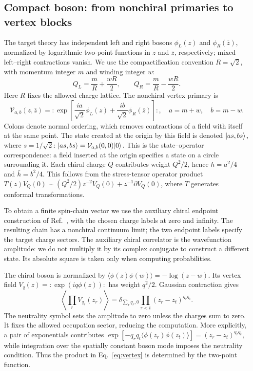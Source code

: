 \subsection{Compact boson: from nonchiral primaries to vertex blocks}
\label{sec:bosonconstruction}
The target theory has independent left and right bosons $\phi_L(z)$ and
$\phi_R(\bar z)$, normalized by logarithmic two-point functions in $z$
and $\bar z$, respectively; mixed left--right contractions vanish.
We use the compactification convention $R=\sqrt2$,
with momentum integer $m$ and winding integer $w$:
\begin{equation}
 Q_L=\frac mR+\frac{wR}{2},\qquad
 Q_R=\frac mR-\frac{wR}{2}.
 \label{eq:bosoncharges}
\end{equation}
Here $R$ fixes the allowed charge lattice. The nonchiral vertex primary is
\begin{equation}
 \mathcal V_{a,b}(z,\bar z)
 ={:}\exp\!\left[\frac{ia}{\sqrt2}\phi_L(z)
                  +\frac{ib}{\sqrt2}\phi_R(\bar z)\right]{:},
 \quad a=m+w,\quad b=m-w.
 \label{eq:fullvertex}
\end{equation}
Colons denote normal ordering, which removes contractions of a field
with itself at the same point. The state created at the origin by this
field is denoted $\lvert as,bs\rangle$, where $s=1/\sqrt2$:
$\lvert as,bs\rangle=\mathcal V_{a,b}(0,0)\lvert 0\rangle$.
This is the state--operator correspondence: a field inserted at the
origin specifies a state on a circle surrounding it.
Each chiral charge $Q$ contributes weight $Q^2/2$, hence
$h=a^2/4$ and $\bar h=b^2/4$. This follows from the stress-tensor
operator product
$T(z)V_Q(0)\sim(Q^2/2)z^{-2}V_Q(0)+z^{-1}\partial V_Q(0)$,
where $T$ generates conformal transformations.

To obtain a finite spin-chain vector we use the auxiliary chiral
endpoint construction of Ref.~\cite{Herwerth}, with the chosen charge
labels at zero and infinity. The resulting chain has a nonchiral
continuum limit; the two endpoint labels specify the target charge
sectors. The auxiliary chiral correlator is the wavefunction amplitude:
we do not multiply it by its complex conjugate to construct a different
state. Its absolute square is taken only when computing probabilities.

The chiral boson is normalized by
$\langle\phi(z)\phi(w)\rangle=-\log(z-w)$. Its vertex field
$V_q(z)={:}\exp(iq\phi(z)){:}$ has weight $q^2/2$. Gaussian contraction gives
\begin{equation}
 \left\langle\prod_r V_{q_r}(z_r)\right\rangle
 =\delta_{\sum_rq_r,0}\prod_{r<t}(z_r-z_t)^{q_rq_t}.
 \label{eq:vertex}
\end{equation}
The neutrality symbol sets the amplitude to zero unless the charges sum to
zero. It fixes the allowed occupation sector, reducing the computation.
More explicitly, a pair of exponentials contributes
$\exp[-q_rq_t\langle\phi(z_r)\phi(z_t)\rangle]
=(z_r-z_t)^{q_rq_t}$, while integration over the spatially constant
boson mode imposes the neutrality condition. Thus the product in
Eq.~\eqref{eq:vertex} is determined by the two-point function.

